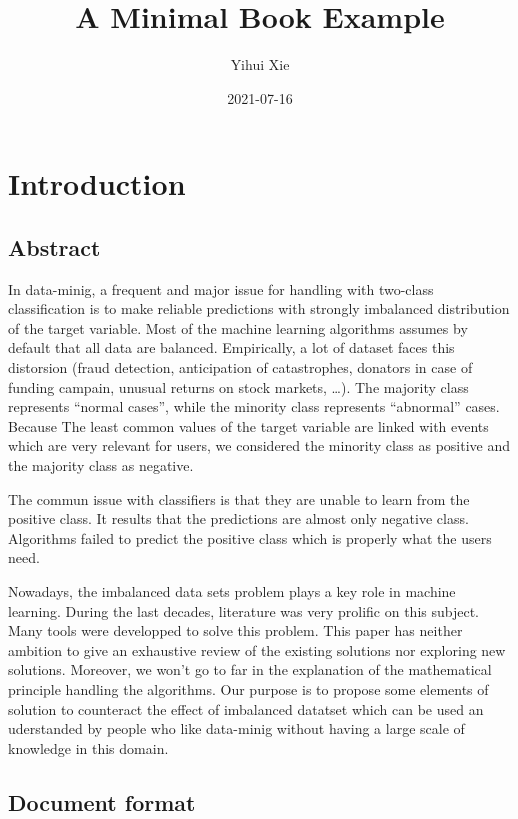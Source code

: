 \documentclass[
]{book}
\title{A Minimal Book Example}
\author{Yihui Xie}
\date{2021-07-16}
\begin{document}
\maketitle

{
\setcounter{tocdepth}{1}
\tableofcontents
}
\hypertarget{introduction}{%
\chapter{Introduction}\label{introduction}}

\hypertarget{abstract}{%
\section{Abstract}\label{abstract}}

In data-minig, a frequent and major issue for handling with two-class classification is to make reliable predictions with strongly imbalanced distribution of the target variable. Most of the machine learning algorithms assumes by default that all data are balanced. Empirically, a lot of dataset faces this distorsion (fraud detection, anticipation of catastrophes, donators in case of funding campain, unusual returns on stock markets, \ldots). The majority class represents ``normal cases'', while the minority class represents ``abnormal'' cases. Because The least common values of the target variable are linked with events which are very relevant for users, we considered the minority class as positive and the majority class as negative.

The commun issue with classifiers is that they are unable to learn from the positive class. It results that the predictions are almost only negative class. Algorithms failed to predict the positive class which is properly what the users need.

Nowadays, the imbalanced data sets problem plays a key role in machine learning. During the last decades, literature was very prolific on this subject. Many tools were developped to solve this problem. This paper has neither ambition to give an exhaustive review of the existing solutions nor exploring new solutions. Moreover, we won't go to far in the explanation of the mathematical principle handling the algorithms. Our purpose is to propose some elements of solution to counteract the effect of imbalanced datatset which can be used an uderstanded by people who like data-minig without having a large scale of knowledge in this domain.

\hypertarget{document-format}{%
\section{Document format}\label{document-format}}
\end{document}
